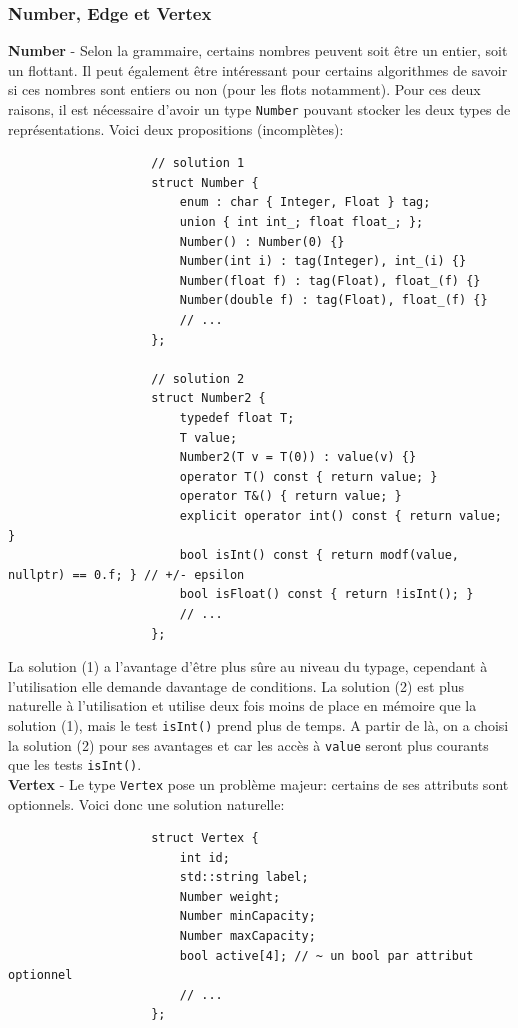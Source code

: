 \documentclass[french]{article}
\begin{document}
			\subsubsection{Number, Edge et Vertex}
				\label{subsubsec:number-edge-et-vertex}
				\textbf{Number} - Selon la grammaire, certains nombres peuvent soit être un entier, soit un flottant. Il peut également être intéressant pour certains algorithmes de savoir si ces nombres sont entiers ou non (pour les flots notamment). Pour ces deux raisons, il est nécessaire d'avoir un type \texttt{Number} pouvant stocker les deux types de représentations. Voici deux propositions (incomplètes):
				
				\begin{lstlisting}
					// solution 1
					struct Number {
						enum : char { Integer, Float } tag;
						union { int int_; float float_; };
						Number() : Number(0) {}
						Number(int i) : tag(Integer), int_(i) {}
						Number(float f) : tag(Float), float_(f) {}
						Number(double f) : tag(Float), float_(f) {}
						// ...
					};
					
					// solution 2
					struct Number2 {
						typedef float T;
						T value;
						Number2(T v = T(0)) : value(v) {}
						operator T() const { return value; }
						operator T&() { return value; }
						explicit operator int() const { return value; }
						bool isInt() const { return modf(value, nullptr) == 0.f; } // +/- epsilon
						bool isFloat() const { return !isInt(); }
						// ...
					};
				\end{lstlisting}
				
				La solution (1) a l'avantage d'être plus sûre au niveau du typage, cependant à l'utilisation elle demande davantage de conditions. La solution (2) est plus naturelle à l'utilisation et utilise deux fois moins de place en mémoire que la solution (1), mais le test \texttt{isInt()} prend plus de temps. A partir de là, on a choisi la solution (2) pour ses avantages et car les accès à \texttt{value} seront plus courants que les tests \texttt{isInt()}.\\
								
				\textbf{Vertex} - Le type \texttt{Vertex} pose un problème majeur: certains de ses attributs sont optionnels. Voici donc une solution naturelle:
				
				\begin{lstlisting}
					struct Vertex {
						int id;
						std::string label;
						Number weight;
						Number minCapacity;
						Number maxCapacity;
						bool active[4]; // ~ un bool par attribut optionnel
						// ...
					};
				\end{lstlisting}
				
\end{document}
